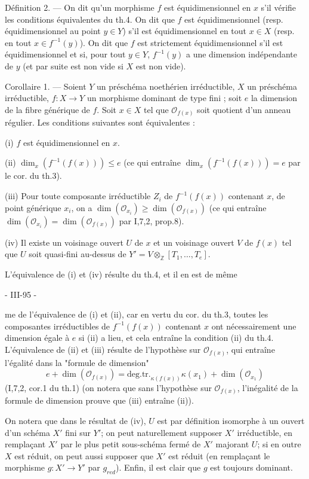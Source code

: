 Définition 2. — On dit qu'un morphisme $f$ est équidimensionnel en $x$ s'il vérifie les conditions équivalentes du th.4. On dit que $f$ est équidimensionnel (resp. équidimensionnel au point $y \in Y$) s'il est équidimensionnel en tout $x \in X$ (resp. en tout $x \in f^{-1}(y)$). On dit que $f$ est strictement équidimensionnel s'il est équidimensionnel et si, pour tout $y \in Y$, $f^{-1}(y)$ a une dimension indépendante de $y$ (et par suite est non vide si $X$ est non vide).

Corollaire 1. — Soient $Y$ un préschéma noethérien irréductible, $X$ un préschéma irréductible, $f : X \to Y$ un morphisme dominant de type fini ; soit $e$ la dimension de la fibre générique de $f$. Soit $x \in X$ tel que $\mathcal{O}_{f(x)}$ soit quotient d'un anneau régulier. Les conditions suivantes sont équivalentes :

(i) $f$ est équidimensionnel en $x$.

(ii) $\dim_x(f^{-1}(f(x))) \le e$ (ce qui entraîne $\dim_x(f^{-1}(f(x))) = e$ par le cor. du th.3).

(iii) Pour toute composante irréductible $Z_i$ de $f^{-1}(f(x))$ contenant $x$, de point générique $x_i$, on a $\dim(\mathcal{O}_{x_i}) \ge \dim(\mathcal{O}_{f(x)})$ (ce qui entraîne $\dim(\mathcal{O}_{x_i}) = \dim(\mathcal{O}_{f(x)})$ par I,7,2, prop.8).

(iv) Il existe un voisinage ouvert $U$ de $x$ et un voisinage ouvert $V$ de $f(x)$ tel que $U$ soit quasi-fini au-dessus de $Y' = V \otimes_{\mathbb{Z}} [T_1, \dots, T_e]$.

L'équivalence de (i) et (iv) résulte du th.4, et il en est de même

\newpage


- III-95 -

me de l'équivalence de (i) et (ii), car en vertu du cor. du th.3, toutes les composantes irréductibles de $f^{-1}(f(x))$ contenant $x$ ont nécessairement une dimension égale à $e$ si (ii) a lieu, et cela entraîne la condition (ii) du th.4. L'équivalence de (ii) et (iii) résulte de l'hypothèse sur $\mathcal{O}_{f(x)}$, qui entraîne l'égalité dans la "formule de dimension"
$$e + \dim(\mathcal{O}_{f(x)}) = \text{deg.tr.}_{\kappa(f(x))} \kappa(x_1) + \dim(\mathcal{O}_{x_1})$$
(I,7,2, cor.1 du th.1) (on notera que sans l'hypothèse sur $\mathcal{O}_{f(x)}$, l'inégalité de la formule de dimension prouve que (iii) entraîne (ii)).

On notera que dans le résultat de (iv), $U$ est par définition isomorphe à un ouvert d'un schéma $X'$ fini sur $Y'$; on peut naturellement supposer $X'$ irréductible, en remplaçant $X'$ par le plus petit sous-schéma fermé de $X'$ majorant $U$; si en outre $X$ est réduit, on peut aussi supposer que $X'$ est réduit (en remplaçant le morphisme $g: X' \to Y'$ par $g_{red}$). Enfin, il est clair que $g$ est toujours dominant.

